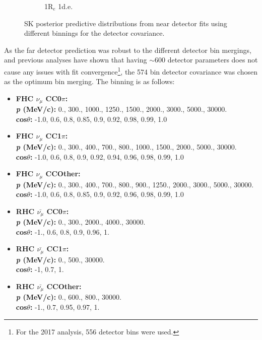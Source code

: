 \begin{figure}[!htbp]
\begin{subfigure}{.49\textwidth}
  \caption{1R$_{e}$ 1d.e.}
\end{subfigure}
\caption{SK posterior predictive distributions from near detector fits using different binnings for the detector covariance.}
\label{fig:detbinSK}
\end{figure}

As the far detector prediction was robust to the different detector bin mergings, and previous analyses have shown that having $\sim$600 detector parameters does not cause any issues with fit convergence\footnote{For the 2017 analysis, 556 detector bins were used.}, the 574 bin detector covariance was chosen as the optimum bin merging. The binning is as follows:

\begin{itemize}
\setlength\itemsep{1mm}
\item \textbf{FHC $\nu_{\mu}$ CC0$\pi$:}\\
\textbf{\textit{p} (MeV/c):} 0., 300., 1000., 1250., 1500., 2000., 3000., 5000., 30000.\\
\textbf{cos$\theta$:} -1.0, 0.6, 0.8, 0.85, 0.9, 0.92, 0.98, 0.99, 1.0

\item \textbf{FHC $\nu_{\mu}$ CC1$\pi$:}\\
\textbf{\textit{p} (MeV/c):} 0., 300., 400., 700., 800., 1000., 1500., 2000., 5000., 30000.\\
\textbf{cos$\theta$:} -1.0, 0.6, 0.8, 0.9, 0.92, 0.94, 0.96, 0.98, 0.99, 1.0

\item \textbf{FHC $\nu_{\mu}$ CCOther:} \\
\textbf{\textit{p} (MeV/c):} 0., 300., 400., 700., 800., 900., 1250., 2000., 3000., 5000., 30000.\\
\textbf{cos$\theta$:} -1.0, 0.6, 0.8, 0.85, 0.9, 0.92, 0.96, 0.98, 0.99, 1.0

\item \textbf{RHC $\bar{\nu_{\mu}}$ CC0$\pi$:}\\
\textbf{\textit{p} (MeV/c):} 0., 300., 2000., 4000., 30000.\\
\textbf{cos$\theta$:} -1., 0.6, 0.8, 0.9, 0.96, 1.

\item \textbf{RHC $\bar{\nu_{\mu}}$ CC1$\pi$:}\\
\textbf{\textit{p} (MeV/c):} 0., 500., 30000.\\
\textbf{cos$\theta$:} -1, 0.7, 1.

\item \textbf{RHC $\bar{\nu_{\mu}}$ CCOther:}\\
\textbf{\textit{p} (MeV/c):} 0., 600., 800., 30000.\\
\textbf{cos$\theta$:} -1., 0.7, 0.95, 0.97, 1.


\end{itemize}
